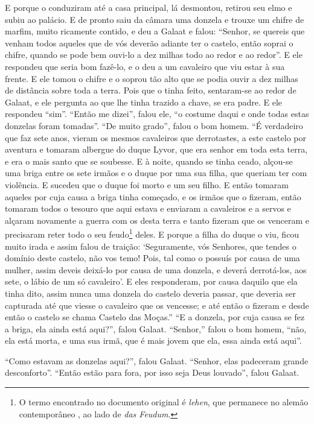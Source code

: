 E porque o conduziram até a casa principal, lá desmontou, retirou seu elmo e
subiu ao palácio. E de pronto saiu da câmara uma donzela e trouxe um chifre de
marfim, muito ricamente contido, e deu a Galaat e falou: “Senhor, se quereis
que venham todos aqueles que de vós deverão adiante ter o castelo, então soprai
o chifre, quando se pode bem ouvi-lo a dez milhas todo ao redor e ao redor”. E
ele respondeu que seria bom fazê-lo, e o deu a um cavaleiro que viu estar à sua
frente. E ele tomou o chifre e o soprou tão alto que se podia ouvir a dez
milhas de distância sobre toda a terra. Pois que o tinha feito, sentaram-se ao
redor de Galaat, e ele pergunta ao que lhe tinha trazido a chave, se era padre.
E ele respondeu “sim”. “Então me dizei”, falou ele, “o costume daqui e onde
todas estas donzelas foram tomadas”. “De muito grado”, falou o bom homem. “É
verdadeiro que faz sete anos, vieram os mesmos cavaleiros que derrotastes, a
este castelo por aventura e tomaram albergue do duque Lyvor, que era senhor em
toda esta terra, e era o mais santo que se soubesse. E à noite, quando se tinha
ceado, alçou-se uma briga entre os sete irmãos e o duque por uma sua filha, que
queriam ter com violência. E sucedeu que o duque foi morto e um seu filho. E
então tomaram aqueles por cuja causa a briga tinha começado, e os irmãos que o
fizeram, então tomaram todos o tesouro que aqui estava e enviaram a cavaleiros
e a servos e alçaram novamente a guerra com os desta terra e tanto fizeram que
os venceram e precisaram reter todo o seu feudo\footnote{ O termo encontrado no
documento original é\textit{ lehen}, que permanece no alemão contemporâneo
, ao lado de \textit{das Feudum}.} deles. E porque
a filha do duque o viu, ficou muito irada e assim falou de traição:
‘Seguramente, vós Senhores, que tendes o domínio deste castelo, não vos temo!
Pois, tal como o possuís por causa de uma mulher, assim deveis deixá-lo por
causa de uma donzela, e deverá derrotá-los, aos sete, o lábio de um só
cavaleiro’. E eles responderam, por causa daquilo que ela tinha dito, assim
nunca uma donzela do castelo deveria passar, que deveria ser capturada até que
viesse o cavaleiro que os vencesse; e até então o fizeram e desde então o
castelo se chama Castelo das Moças.” “E a donzela, por cuja causa se fez a
briga, ela ainda está aqui?”, falou Galaat. “Senhor,” falou o bom homem, “não,
ela está morta, e uma sua irmã, que é mais jovem que ela, essa ainda está
aqui”. 

“Como estavam as donzelas aqui?”, falou Galaat. “Senhor, elas padeceram grande
desconforto”. “Então estão para fora, por isso seja Deus louvado”, falou Galaat. 

